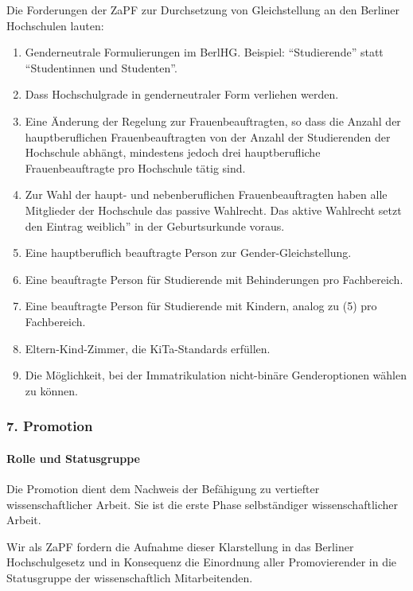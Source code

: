 \documentclass[DIV=calc]{scrartcl}
\begin{document}
Die Forderungen der ZaPF zur Durchsetzung von Gleichstellung an den Berliner
Hochschulen lauten:
\begin{enumerate}
\def\labelenumi{\arabic{enumi})}
\item Genderneutrale Formulierungen im BerlHG. Beispiel:
  \enquote{Studierende} statt \enquote{Studentinnen und Studenten}.
\item Dass Hochschulgrade in genderneutraler Form verliehen werden.
\item Eine Änderung der Regelung zur Frauenbeauftragten, so dass die Anzahl
  der hauptberuflichen Frauenbeauftragten von der Anzahl der Studierenden der
  Hochschule abhängt, mindestens jedoch drei hauptberufliche Frauenbeauftragte
  pro Hochschule tätig sind.
\item Zur Wahl der haupt- und nebenberuflichen Frauenbeauftragten haben
  alle Mitglieder der Hochschule das passive Wahlrecht. Das aktive Wahlrecht
  setzt den Eintrag \glqq weiblich'' in der Geburtsurkunde voraus.
\item Eine hauptberuflich beauftragte Person zur Gender-Gleichstellung.
\item Eine beauftragte Person für Studierende mit Behinderungen
  pro Fachbereich.
\item Eine beauftragte Person für Studierende mit Kindern, analog zu (5)
  pro Fachbereich.
\item Eltern-Kind-Zimmer, die KiTa-Standards erfüllen.
\item Die Möglichkeit, bei der Immatrikulation nicht-binäre Genderoptionen
  wählen zu können.
\end{enumerate}

\hypertarget{promotion}{%
\subsubsection*{7. Promotion}\label{promotion}}

\hypertarget{rolle-und-statusgruppe}{%
\paragraph{Rolle und Statusgruppe}\label{rolle-und-statusgruppe}}

Die Promotion dient dem Nachweis der Befähigung zu vertiefter wissenschaftlicher Arbeit. Sie ist die erste Phase selbständiger wissenschaftlicher Arbeit. 

Wir als ZaPF fordern die Aufnahme dieser Klarstellung in das Berliner Hochschulgesetz und in Konsequenz die Einordnung aller Promovierender in die Statusgruppe der wissenschaftlich %
Mitarbeitenden.
\end{document}

